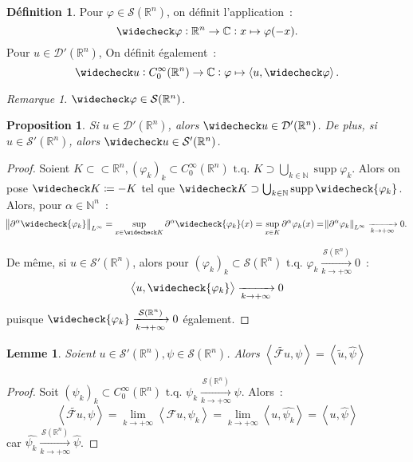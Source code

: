 \documentclass{report}
\DeclareMathOperator{\supp}{supp}
\newcommand{\C}{{\mathbb C}}
\newcommand{\R}{{\mathbb R}}
\newcommand{\N}{{\mathbb N}}
\newcommand{\scpr}[2]{\left\langle#1, #2\right\rangle}
\newcommand{\tq}{\text{ t.q. }}
\newcommand{\st}{\tq}
\newcommand{\pinfty}{{+\infty}}
\newtheorem{prp}[thm]{Proposition}
\newtheorem{lem}[thm]{Lemme}
\theoremstyle{definition}
\newtheorem{déf}[thm]{Définition}
\theoremstyle{remark}
\newtheorem*{rmq}{Remarque}
\begin{document}
\begin{déf} Pour $\varphi \in \mathcal S(\R^n)$, on définit l'application~:
\[\widecheck \varphi : \R^n \to \C : x \mapsto \varphi(-x).\]
Pour $u \in \mathcal D'(\R^n)$, On définit également~:
\[\widecheck u : C^\infty_0(\R^n) \to \C : \varphi \mapsto \scpr u{\widecheck \varphi}.\]
\end{déf}

\begin{rmq} $\widecheck \varphi \in \mathcal S(\R^n)$.
\end{rmq}

\begin{prp} Si $u \in \mathcal D'(\R^n)$, alors $\widecheck u \in \mathcal D'(\R^n)$. De plus, si $u \in \mathcal S'(\R^n)$, alors $\widecheck u \in \mathcal S'(\R^n)$.
\end{prp}

\begin{proof} Soient $K \subset\subset \R^n, (\varphi_k)_k \subset C^\infty_0(\R^n) \st K \supset \bigcup_{k \in \N}\supp\varphi_k$. Alors on pose
$\widecheck K \coloneqq -K$ tel que $\widecheck K \supset \bigcup_{k \in \N}\supp\widecheck {\varphi_k}$. Alors, pour $\alpha \in \N^n$~:
\[\norm {\partial^\alpha\widecheck{\varphi_k}}_{L^\infty} = \sup_{x \in \widecheck K}\partial^\alpha\widecheck {\varphi_k}(x) = \sup_{x \in K}\partial^\alpha\varphi_k(x)
= \norm {\partial^\alpha\varphi_k}_{L^\infty} \xrightarrow[k \to \pinfty]{} 0.\]

De même, si $u \in \mathcal S'(\R^n)$, alors pour $(\varphi_k)_k \subset \mathcal S(\R^n) \st \varphi_k \xrightarrow[k \to \pinfty]{\mathcal S(\R^n)} 0$~:
\[\scpr u{\widecheck {\varphi_k}} \xrightarrow[k \to \pinfty]{} 0\]
puisque $\widecheck {\varphi_k} \xrightarrow[k \to \pinfty]{\mathcal S(\R^n)} 0$ également.
\end{proof}

\begin{lem}\label{lem:Fourier distribution prolongée} Soient $u \in \mathcal S'(\R^n), \psi \in \mathcal S(\R^n)$.
Alors $\scpr {\widetilde {\mathcal Fu}}\psi = \scpr {\widetilde u}{\widehat \psi}$
\end{lem}

\begin{proof} Soit $(\psi_k)_k \subset C^\infty_0(\R^n) \st \psi_k \xrightarrow[k \to \pinfty]{\mathcal S(\R^n)} \psi$. Alors~:
\[\scpr {\widetilde {\mathcal Fu}}\psi = \lim_{k \to \pinfty}\scpr {\mathcal Fu}{\psi_k} = \lim_{k \to \pinfty}\scpr u{\widehat {\psi_k}} = \scpr u{\widehat \psi}\]
car $\widehat {\psi_k} \xrightarrow[k \to \pinfty]{\mathcal S(\R^n)} \widehat \psi$.
\end{proof}
\end{document}
